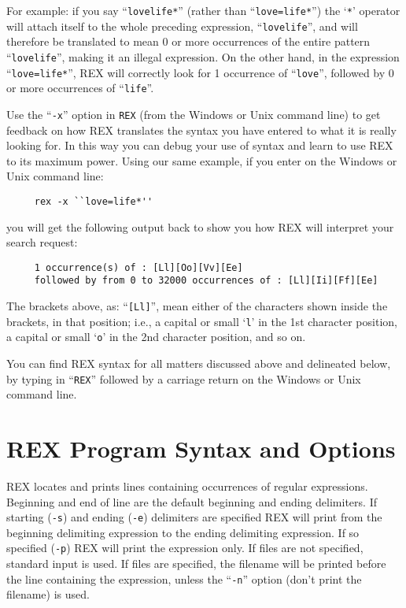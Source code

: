 For example:  if you say ``\verb`lovelife*`'' (rather than
``\verb`love=life*`'') the `\verb`*`' operator will attach itself to
the whole preceding expression, ``\verb`lovelife`'', and will
therefore be translated to mean 0 or more occurrences of the entire
pattern ``\verb`lovelife`'', making it an illegal expression.  On the
other hand, in the expression ``\verb`love=life*`'', REX will
correctly look for 1 occurrence of ``\verb`love`'', followed by 0 or
more occurrences of ``\verb`life`''.

Use the ``\verb`-x`'' option in \verb`REX` (from the Windows or Unix
command line) to get feedback on how REX translates the syntax you
have entered to what it is really looking for.  In this way you can
debug your use of syntax and learn to use REX to its maximum power.
Using our same example, if you enter on the Windows or Unix command line:

\begin{verbatim}
     rex -x ``love=life*''
\end{verbatim}

you will get the following output back to show you how REX will
interpret your search request:

\begin{verbatim}
     1 occurrence(s) of : [Ll][Oo][Vv][Ee]
     followed by from 0 to 32000 occurrences of : [Ll][Ii][Ff][Ee]
\end{verbatim}

The brackets above, as:  ``\verb`[Ll]`'', mean either of the
characters shown inside the brackets, in that position; i.e., a
capital or small `\verb`l`' in the 1st character position, a capital
or small `\verb`o`' in the 2nd character position, and so on.

You can find REX syntax for all matters discussed above and delineated
below, by typing in ``\verb`REX`'' followed by a carriage return on
the Windows or Unix command line.

\section{REX Program Syntax and Options}

REX locates and prints lines containing occurrences of regular
expressions.  Beginning and end of line are the default beginning and
ending delimiters.  If starting (\verb`-s`) and ending (\verb`-e`)
delimiters are specified REX will print from the beginning delimiting
expression to the ending delimiting expression.  If so specified
(\verb`-p`) REX will print the expression only.  If files are not
specified, standard input is used.  If files are specified, the
filename will be printed before the line containing the expression,
unless the ``\verb`-n`'' option (don't print the filename) is used.

